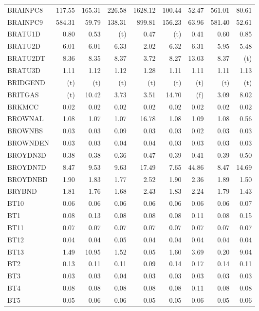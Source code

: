 \documentclass[11pt,twoside]{article}
\begin{document}
{\begin{longtable}[c]{|l|r|r|r|r|r|r|r|r|}
BRAINPC8 & 117.55 & 165.31 & 226.58 & 1628.12 & 100.44 & 52.47 & 561.01 & 80.61 \\
BRAINPC9 & 584.31 & 59.79 & 138.31 & 899.81 & 156.23 & 63.96 & 581.40 & 52.61 \\
BRATU1D & 0.80 & 0.53 & (t) & 0.47 & (t) & 0.41 & 0.60 & 0.85 \\
BRATU2D & 6.01 & 6.01 & 6.33 & 2.02 & 6.32 & 6.31 & 5.95 & 5.48 \\
BRATU2DT & 8.36 & 8.35 & 8.37 & 3.72 & 8.27 & 13.03 & 8.37 & (t) \\
BRATU3D & 1.11 & 1.12 & 1.12 & 1.28 & 1.11 & 1.11 & 1.11 & 1.13 \\
BRIDGEND & (t) & (t) & (t) & (t) & (t) & (t) & (t) & (t) \\
BRITGAS & (t) & 10.42 & 3.73 & 3.51 & 14.70 & (f) & 3.09 & 8.02 \\
BRKMCC & 0.02 & 0.02 & 0.02 & 0.02 & 0.02 & 0.02 & 0.02 & 0.02 \\
BROWNAL & 1.08 & 1.07 & 1.07 & 16.78 & 1.08 & 1.09 & 1.08 & 0.56 \\
BROWNBS & 0.03 & 0.03 & 0.09 & 0.03 & 0.03 & 0.02 & 0.03 & 0.03 \\
BROWNDEN & 0.03 & 0.03 & 0.04 & 0.04 & 0.03 & 0.03 & 0.03 & 0.03 \\
BROYDN3D & 0.38 & 0.38 & 0.36 & 0.47 & 0.39 & 0.41 & 0.39 & 0.50 \\
BROYDN7D & 8.47 & 9.53 & 9.63 & 17.49 & 7.65 & 44.86 & 8.47 & 14.69 \\
BROYDNBD & 1.90 & 1.83 & 1.77 & 2.52 & 1.90 & 2.36 & 1.89 & 1.50 \\
BRYBND & 1.81 & 1.76 & 1.68 & 2.43 & 1.83 & 2.24 & 1.79 & 1.43 \\
BT10 & 0.06 & 0.06 & 0.06 & 0.06 & 0.06 & 0.06 & 0.06 & 0.07 \\
BT1 & 0.08 & 0.13 & 0.08 & 0.08 & 0.08 & 0.11 & 0.08 & 0.15 \\
BT11 & 0.07 & 0.07 & 0.07 & 0.07 & 0.07 & 0.07 & 0.07 & 0.07 \\
BT12 & 0.04 & 0.04 & 0.05 & 0.04 & 0.04 & 0.04 & 0.04 & 0.04 \\
BT13 & 1.49 & 10.95 & 1.52 & 0.05 & 1.60 & 3.69 & 0.20 & 9.04 \\
BT2 & 0.13 & 0.11 & 0.11 & 0.09 & 0.14 & 0.17 & 0.14 & 0.11 \\
BT3 & 0.03 & 0.03 & 0.04 & 0.03 & 0.03 & 0.03 & 0.03 & 0.03 \\
BT4 & 0.08 & 0.08 & 0.08 & 0.08 & 0.08 & 0.11 & 0.08 & 0.08 \\
BT5 & 0.05 & 0.06 & 0.06 & 0.05 & 0.05 & 0.06 & 0.05 & 0.06 \\

\end{longtable}}
\end{document}
